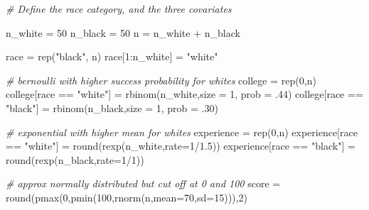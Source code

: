 \documentclass[
]{article}
\newenvironment{Shaded}{\begin{snugshade}}{\end{snugshade}}
\newcommand{\AttributeTok}[1]{\textcolor[rgb]{0.77,0.63,0.00}{#1}}
\newcommand{\CommentTok}[1]{\textcolor[rgb]{0.56,0.35,0.01}{\textit{#1}}}
\newcommand{\DecValTok}[1]{\textcolor[rgb]{0.00,0.00,0.81}{#1}}
\newcommand{\FloatTok}[1]{\textcolor[rgb]{0.00,0.00,0.81}{#1}}
\newcommand{\FunctionTok}[1]{\textcolor[rgb]{0.00,0.00,0.00}{#1}}
\newcommand{\NormalTok}[1]{#1}
\newcommand{\OtherTok}[1]{\textcolor[rgb]{0.56,0.35,0.01}{#1}}
\newcommand{\SpecialCharTok}[1]{\textcolor[rgb]{0.00,0.00,0.00}{#1}}
\newcommand{\StringTok}[1]{\textcolor[rgb]{0.31,0.60,0.02}{#1}}
\begin{document}
\begin{Shaded}
\begin{Highlighting}[]
\CommentTok{\# Define the race category, and the three covariates}

\NormalTok{n\_white }\OtherTok{=} \DecValTok{50}
\NormalTok{n\_black }\OtherTok{=} \DecValTok{50}
\NormalTok{n }\OtherTok{=}\NormalTok{ n\_white }\SpecialCharTok{+}\NormalTok{ n\_black}

\NormalTok{race }\OtherTok{=} \FunctionTok{rep}\NormalTok{(}\StringTok{"black"}\NormalTok{, n)}
\NormalTok{race[}\DecValTok{1}\SpecialCharTok{:}\NormalTok{n\_white] }\OtherTok{=} \StringTok{"white"}

\CommentTok{\# bernoulli with higher success probability for whites}
\NormalTok{college }\OtherTok{=} \FunctionTok{rep}\NormalTok{(}\DecValTok{0}\NormalTok{,n)}
\NormalTok{college[race }\SpecialCharTok{==} \StringTok{"white"}\NormalTok{] }\OtherTok{=} \FunctionTok{rbinom}\NormalTok{(n\_white,}\AttributeTok{size =} \DecValTok{1}\NormalTok{, }\AttributeTok{prob =}\NormalTok{ .}\DecValTok{44}\NormalTok{)}
\NormalTok{college[race }\SpecialCharTok{==} \StringTok{"black"}\NormalTok{] }\OtherTok{=} \FunctionTok{rbinom}\NormalTok{(n\_black,}\AttributeTok{size =} \DecValTok{1}\NormalTok{, }\AttributeTok{prob =}\NormalTok{ .}\DecValTok{30}\NormalTok{)}

\CommentTok{\# exponential with higher mean for whites}
\NormalTok{experience }\OtherTok{=} \FunctionTok{rep}\NormalTok{(}\DecValTok{0}\NormalTok{,n)}
\NormalTok{experience[race }\SpecialCharTok{==} \StringTok{"white"}\NormalTok{] }\OtherTok{=} \FunctionTok{round}\NormalTok{(}\FunctionTok{rexp}\NormalTok{(n\_white,}\AttributeTok{rate=}\DecValTok{1}\SpecialCharTok{/}\FloatTok{1.5}\NormalTok{))}
\NormalTok{experience[race }\SpecialCharTok{==} \StringTok{"black"}\NormalTok{] }\OtherTok{=} \FunctionTok{round}\NormalTok{(}\FunctionTok{rexp}\NormalTok{(n\_black,}\AttributeTok{rate=}\DecValTok{1}\SpecialCharTok{/}\DecValTok{1}\NormalTok{))}

\CommentTok{\# approx normally distributed but cut off at 0 and 100}
\NormalTok{score }\OtherTok{=} \FunctionTok{round}\NormalTok{(}\FunctionTok{pmax}\NormalTok{(}\DecValTok{0}\NormalTok{,}\FunctionTok{pmin}\NormalTok{(}\DecValTok{100}\NormalTok{,}\FunctionTok{rnorm}\NormalTok{(n,}\AttributeTok{mean=}\DecValTok{70}\NormalTok{,}\AttributeTok{sd=}\DecValTok{15}\NormalTok{))),}\DecValTok{2}\NormalTok{)}
\end{Highlighting}
\end{Shaded}
\end{document}
